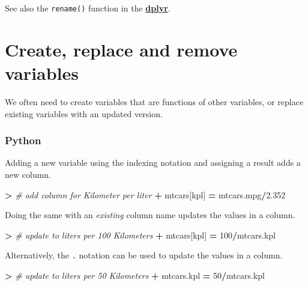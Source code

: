 \documentclass[
]{book}
\newenvironment{Shaded}{\begin{snugshade}}{\end{snugshade}}
\newcommand{\CommentTok}[1]{\textcolor[rgb]{0.56,0.35,0.01}{\textit{#1}}}
\newcommand{\DecValTok}[1]{\textcolor[rgb]{0.00,0.00,0.81}{#1}}
\newcommand{\FloatTok}[1]{\textcolor[rgb]{0.00,0.00,0.81}{#1}}
\newcommand{\NormalTok}[1]{#1}
\newcommand{\OperatorTok}[1]{\textcolor[rgb]{0.81,0.36,0.00}{\textbf{#1}}}
\newcommand{\StringTok}[1]{\textcolor[rgb]{0.31,0.60,0.02}{#1}}
\begin{document}
See also the \texttt{rename()} function in the \href{https://dplyr.tidyverse.org/}{\textbf{dplyr}}.

\hypertarget{create-replace-and-remove-variables}{%
\section{Create, replace and remove variables}\label{create-replace-and-remove-variables}}

We often need to create variables that are functions of other variables, or replace existing variables with an updated version.

\hypertarget{python-21}{%
\subsubsection*{Python}\label{python-21}}

Adding a new variable using the indexing notation and assigning a result adds a new column.

\begin{Shaded}
\begin{Highlighting}[]
\OperatorTok{\textgreater{}} \CommentTok{\# add column for Kilometer per liter}
\OperatorTok{+}\NormalTok{ mtcars[}\StringTok{\textquotesingle{}kpl\textquotesingle{}}\NormalTok{] }\OperatorTok{=}\NormalTok{ mtcars.mpg}\OperatorTok{/}\FloatTok{2.352}
\end{Highlighting}
\end{Shaded}

Doing the same with an \emph{existing} column name updates the values in a column.

\begin{Shaded}
\begin{Highlighting}[]
\OperatorTok{\textgreater{}} \CommentTok{\# update to liters per 100 Kilometers}
\OperatorTok{+}\NormalTok{ mtcars[}\StringTok{\textquotesingle{}kpl\textquotesingle{}}\NormalTok{] }\OperatorTok{=} \DecValTok{100}\OperatorTok{/}\NormalTok{mtcars.kpl }
\end{Highlighting}
\end{Shaded}

Alternatively, the \texttt{.} notation can be used to update the values in a column.

\begin{Shaded}
\begin{Highlighting}[]
\OperatorTok{\textgreater{}} \CommentTok{\# update to liters per 50 Kilometers}
\OperatorTok{+}\NormalTok{ mtcars.kpl }\OperatorTok{=} \DecValTok{50}\OperatorTok{/}\NormalTok{mtcars.kpl }
\end{Highlighting}
\end{Shaded}
\end{document}
